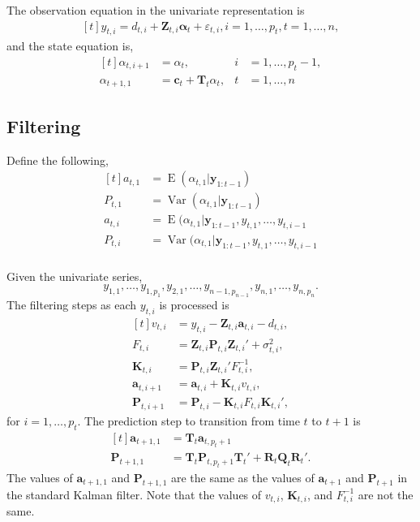 \documentclass[]{book}
\DeclareMathOperator{\E}{E}
\DeclareMathOperator{\Var}{Var}
\newcommand{\mat}[1]{\boldsymbol{#1}}
\renewcommand{\vec}[1]{\boldsymbol{#1}}
\renewcommand{\T}{'}
\begin{document}
The observation equation in the univariate representation is \[
\begin{aligned}[t]
y_{t, i} = d_{t, i} + \vec{Z}_{t, i} \vec{\alpha}_t + \varepsilon_{t, i},  i = 1, \dots, p_t,  t = 1, \dots, n ,
\end{aligned}
\] and the state equation is, \[
\begin{aligned}[t]
\alpha_{t, i + 1} &= \alpha_t, & i &= 1, \dots, p_{t} - 1, \\
\alpha_{t + 1, 1} &= \vec{c}_t + \mat{T}_t \alpha_t, & t &= 1, \dots, n
\end{aligned}
\]

\subsection{Filtering}\label{filtering-1}

Define the following, \[
\begin{aligned}[t]
a_{t,1} &= \E(\alpha_{t,1} | \vec{y}_{1:t-1}) \\
P_{t,1} &= \Var(\alpha_{t,1} | \vec{y}_{1:t-1}) \\
a_{t,i} &= \E(\alpha_{t,1} | \vec{y}_{1:t-1}, y_{t,1}, \dots, y_{t,i - 1} \\
P_{t,i} &= \Var(\alpha_{t,1} | \vec{y}_{1:t-1}, y_{t,1}, \dots, y_{t,i - 1} \\  
\end{aligned}
\]

Given the univariate series, \[
y_{1,1}, \dots, y_{1,p_1}, y_{2,1}, \dots, y_{n - 1, p_{n -1}}, y_{n,1}, \dots, y_{n, p_n} .
\] The filtering steps as each \(y_{t,i}\) is processed is \[
\begin{aligned}[t]
v_{t,i} &= y_{t,i} - \vec{Z}_{t,i} \vec{a}_{t,i} - d_{t,i}, \\
F_{t,i} &= \vec{Z}_{t,i} \mat{P}_{t,i} \vec{Z}_{t,i}\T + \sigma^2_{t,i}, \\
\vec{K}_{t, i} &= \mat{P}_{t,i} \vec{Z}_{t,i}\T F^{-1}_{t,i}, \\
\vec{a}_{t, i + 1} &= \vec{a}_{t,i} + \vec{K}_{t,i} v_{t,i}, \\
\mat{P}_{t, i + 1} &= \mat{P}_{t,i} - \vec{K}_{t,i} F_{t,i} \vec{K}_{t,i}\T ,
\end{aligned}
\] for \(i = 1, \dots, p_t\). The prediction step to transition from
time \(t\) to \(t + 1\) is \[
\begin{aligned}[t]
\vec{a}_{t + 1, 1} &= \mat{T}_t \vec{a}_{t, p_t + 1} \\
\mat{P}_{t + 1, 1} &= \mat{T}_t \mat{P}_{t,p_t + 1} \mat{T}_t\T + \mat{R}_t \mat{Q}_t \mat{R}_t \T .
\end{aligned}
\] The values of \(\vec{a}_{t + 1, 1}\) and \(\mat{P}_{t + 1, 1}\) are
the same as the values of \(\vec{a}_{t + 1}\) and \(\mat{P}_{t + 1}\) in
the standard Kalman filter. Note that the values of \(v_{t,i}\),
\(\vec{K}_{t,i}\), and \(F_{t,i}^{-1}\) are not the same.
\end{document}
